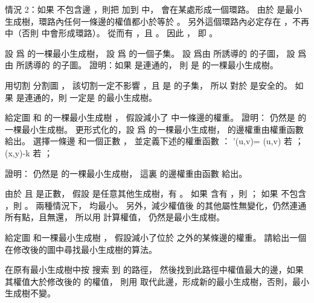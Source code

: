 情況 2：如果  不包含邊 ，則把  加到  中，
會在某處形成一個環路。
由於  是最小生成樹，環路內任何一條邊的權值都小於等於 。
另外這個環路內必定存在 ，不再  中（否則  中會形成環路）。
從而有 ，且 。
因此 ，
即 。
\stopANSWER

\startEXERCISE
設  爲  的一棵最小生成樹，
設  爲  的一個子集。
設  爲由  所誘導的  的子圖，
設  爲由  所誘導的  的子圖。
證明：如果  是連通的，
則  是  的一棵最小生成樹。
\stopEXERCISE

\startANSWER
用切割  分割圖 ，
該切割一定不影響 ，且  是  的子集，
所以  對於  是安全的。
如果  是連通的，則  一定是  的最小生成樹。
\stopANSWER

\startEXERCISE
給定圖  和  的一棵最小生成樹 ，
假設減小了  中一條邊的權重。
證明：  仍然是  的一棵最小生成樹。
更形式化的，設  爲  的一棵最小生成樹，  的邊權重由權重函數 \m{\omega} 給出。
選擇一條邊  和一個正數 ，
並定義下述的權重函數 ：
\startformula
\omega'(u,v)=\startcases
\NC \omega(u,v) \NC 若 ； \NR
\NC \omega(x,y)-k \NC 若 ； \NR
\stopcases
\stopformula

證明：  仍然是  的一棵最小生成樹，
這裏  的邊權重由函數  給出。
\stopEXERCISE

\startANSWER
由於  且  是正數，
假設  是任意其他生成樹，有 。
如果  含有 ，則 ；
如果  不包含 ，則 。
兩種情況下，  均最小。
另外，減少權值後  的其他屬性無變化，仍然連通所有點，且無還，
所以用  計算權值，  仍然是最小生成樹。
\stopANSWER

\startEXERCISE\DIFFICULT
給定圖  和一棵最小生成樹 ，
假設減小了位於  之外的某條邊的權重。
請給出一個在修改後的圖中尋找最小生成樹的算法。
\stopEXERCISE

\startANSWER
在原有最小生成樹中按  搜索  到  的路徑，
然後找到此路徑中權值最大的邊，如果其權值大於修改後的  的權值，
則用  取代此邊，形成新的最小生成樹，否則，最小生成樹不變。
\stopANSWER

\stopsection
